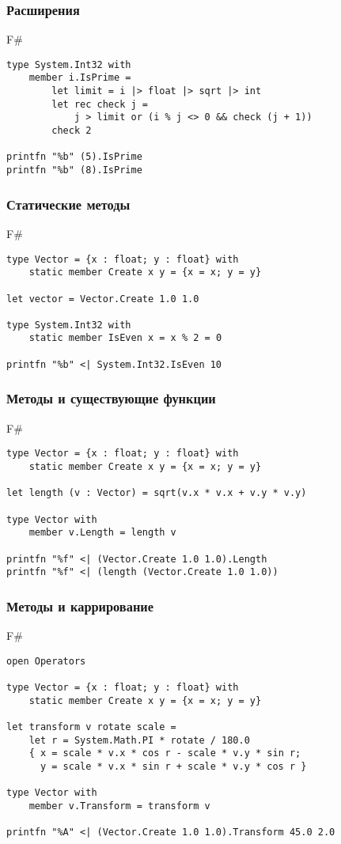 \documentclass[xetex,mathserif,serif]{beamer}
\begin{document}
	\begin{frame}[fragile]
		\frametitle{Расширения}
		\begin{exampleblock}{F\#}
			\begin{lstlisting}
type System.Int32 with
    member i.IsPrime = 
        let limit = i |> float |> sqrt |> int
        let rec check j =
            j > limit or (i % j <> 0 && check (j + 1))
        check 2

printfn "%b" (5).IsPrime
printfn "%b" (8).IsPrime
\end{lstlisting}
\end{exampleblock}
\end{frame}

	\begin{frame}[fragile]
		\frametitle{Статические методы}
		\begin{exampleblock}{F\#}
			\begin{lstlisting}
type Vector = {x : float; y : float} with
    static member Create x y = {x = x; y = y}
    
let vector = Vector.Create 1.0 1.0

type System.Int32 with
    static member IsEven x = x % 2 = 0

printfn "%b" <| System.Int32.IsEven 10
\end{lstlisting}
\end{exampleblock}
\end{frame}

	\begin{frame}[fragile]
		\frametitle{Методы и существующие функции}
		\begin{exampleblock}{F\#}
			\begin{lstlisting}
type Vector = {x : float; y : float} with
    static member Create x y = {x = x; y = y}

let length (v : Vector) = sqrt(v.x * v.x + v.y * v.y)

type Vector with
    member v.Length = length v

printfn "%f" <| (Vector.Create 1.0 1.0).Length
printfn "%f" <| (length (Vector.Create 1.0 1.0))
\end{lstlisting}
\end{exampleblock}
\end{frame}

	\begin{frame}[fragile]
		\frametitle{Методы и каррирование}
		\begin{exampleblock}{F\#}
			\begin{lstlisting}
open Operators

type Vector = {x : float; y : float} with
    static member Create x y = {x = x; y = y}

let transform v rotate scale = 
    let r = System.Math.PI * rotate / 180.0
    { x = scale * v.x * cos r - scale * v.y * sin r;
      y = scale * v.x * sin r + scale * v.y * cos r }

type Vector with
    member v.Transform = transform v

printfn "%A" <| (Vector.Create 1.0 1.0).Transform 45.0 2.0
\end{lstlisting}
\end{exampleblock}
\end{frame}
	
\end{document}
